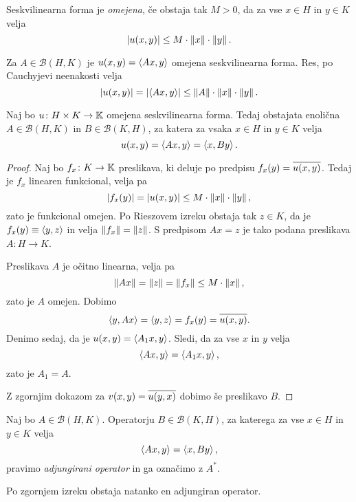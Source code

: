 \begin{definicija}
Seskvilinearna forma je
\emph{omejena}, če obstaja tak
$M > 0$, da za vse $x \in H$ in $y \in K$ velja
\[
\left\lvert u(x,y)\right\rvert \leq M \cdot \left\lVert x\right\rVert \cdot \left\lVert y\right\rVert.
\]
\end{definicija}

\begin{zgled}
Za $A \in \mathcal{B}(H,K)$ je $u(x,y) = \left\langle Ax,y\right\rangle$ omejena
seskvilinearna forma. Res, po Cauchyjevi neenakosti velja
\[
\left\lvert u(x,y)\right\rvert = \left\lvert \left\langle Ax,y\right\rangle\right\rvert \leq
\left\lVert A\right\rVert \cdot \left\lVert x\right\rVert \cdot \left\lVert y\right\rVert. \qedhere
\]
\end{zgled}


\begin{izrek}
Naj bo $u \colon H \times K \to \mathbb{K}$ omejena seskvilinearna forma.
Tedaj obstajata enolična $A \in \mathcal{B}(H,K)$ in
$B \in \mathcal{B}(K,H)$, za katera za vsaka $x \in H$ in $y \in K$
velja
\[
u(x,y) = \left\langle Ax,y\right\rangle = \left\langle x,By\right\rangle.
\]
\end{izrek}

\begin{proof}
Naj bo $f_x \colon K \to \mathbb{K}$ preslikava, ki deluje po predpisu
$f_x(y) = \overline{u(x,y)}$. Tedaj je $f_x$ linearen funkcional,
velja pa
\[
\left\lvert f_x(y)\right\rvert = \left\lvert u(x,y)\right\rvert \leq M \cdot \left\lVert x\right\rVert \cdot \left\lVert y\right\rVert,
\]
zato je funkcional omejen. Po Rieszovem izreku obstaja tak
$z \in K$, da je $f_x(y) \equiv \left\langle y,z\right\rangle$ in velja
$\left\lVert f_x\right\rVert = \left\lVert z\right\rVert$. S predpisom $Ax = z$ je tako podana
preslikava $A \colon H \to K$.

Preslikava $A$ je očitno linearna, velja pa
\[
\left\lVert Ax\right\rVert = \left\lVert z\right\rVert = \left\lVert f_x\right\rVert \leq M \cdot \left\lVert x\right\rVert,
\]
zato je $A$ omejen. Dobimo
\[
\left\langle y,Ax\right\rangle = \left\langle y,z\right\rangle = f_x(y) = \overline{u(x,y)}.
\]
Denimo sedaj, da je $u(x,y) = \left\langle A_1x,y\right\rangle$. Sledi, da za vse $x$
in $y$ velja
\[
\left\langle Ax,y\right\rangle = \left\langle A_1x,y\right\rangle,
\]
zato je $A_1 = A$.

Z zgornjim dokazom za $v(x,y) = \overline{u(y,x)}$ dobimo še
preslikavo $B$.
\end{proof}

\begin{definicija}
Naj bo $A \in \mathcal{B}(H,K)$. Operatorju
$B \in \mathcal{B}(K,H)$, za katerega za vse $x \in H$ in $y \in K$
velja
\[
\left\langle Ax,y\right\rangle = \left\langle x,By\right\rangle,
\]
pravimo \emph{adjungirani operator} in
ga označimo z $A^*$.
\end{definicija}

\begin{opomba}
Po zgornjem izreku obstaja natanko en adjungiran operator.
\end{opomba}

